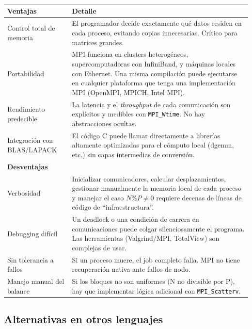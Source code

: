 \documentclass[12pt,a4paper]{article}
\begin{document}
\begin{longtable}{L{4cm} L{10cm}}
\toprule
\textbf{Ventajas} & \textbf{Detalle} \\
\midrule
\endhead
Control total de memoria & El programador decide exactamente qué datos residen en
  cada proceso, evitando copias innecesarias. Crítico para matrices grandes. \\[4pt]
Portabilidad & MPI funciona en clusters heterogéneos, supercomputadoras con
  InfiniBand, y máquinas locales con Ethernet. Una misma compilación puede
  ejecutarse en cualquier plataforma que tenga una implementación MPI
  (OpenMPI, MPICH, Intel MPI). \\[4pt]
Rendimiento predecible & La latencia y el \textit{throughput} de cada comunicación
  son explícitos y medibles con \texttt{MPI\_Wtime}. No hay abstracciones ocultas. \\[4pt]
Integración con BLAS/LAPACK & El código C puede llamar directamente a librerías
  altamente optimizadas para el cómputo local (dgemm, etc.) sin capas
  intermedias de conversión. \\
\midrule
\textbf{Desventajas} & \\
\midrule
Verbosidad & Inicializar comunicadores, calcular desplazamientos, gestionar
  manualmente la memoria local de cada proceso y manejar el caso $N \% P \neq 0$
  requiere decenas de líneas de código de ``infraestructura''. \\[4pt]
Debugging difícil & Un deadlock o una condición de carrera en comunicaciones
  puede colgar silenciosamente el programa. Las herramientas (Valgrind/MPI,
  TotalView) son complejas de usar. \\[4pt]
Sin tolerancia a fallos & Si un proceso muere, el job completo falla. MPI no
  tiene recuperación nativa ante fallos de nodo. \\[4pt]
Manejo manual del balance & Si los bloques no son uniformes (N no divisible por P),
  hay que implementar lógica adicional con \texttt{MPI\_Scatterv}. \\
\bottomrule
\end{longtable}

\subsection{Alternativas en otros lenguajes}
\end{document}
